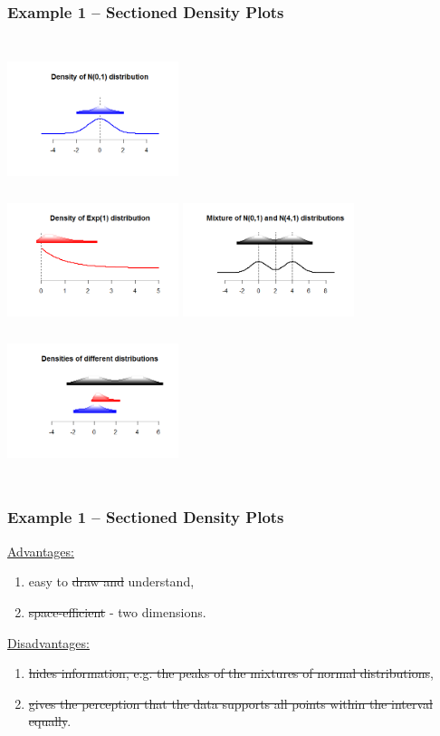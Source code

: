 \documentclass[11pt,usenames,dvipsnames,svgnames,x11names]{beamer}
\theoremstyle{plain}
\theoremstyle{definition}
\theoremstyle{remark}
\begin{document}
\begin{frame}
	\frametitle{Example 1 -- Sectioned Density Plots}
	\begin{columns}[t]
			\centering
			\includegraphics[width=5cm,height=4cm]{111111.png}\\
			\includegraphics[width=5cm,height=4cm]{222222.png}
		\centering
		\includegraphics[width=5cm,height=4cm]{333333.png}\\
		\includegraphics[width=5cm,height=4cm]{444444.png}
	\end{columns}
\end{frame}

\begin{frame}
	\frametitle{Example 1 -- Sectioned Density Plots}
	\underline{Advantages:}	
	\begin{enumerate}
		\item easy to \sout{draw and} understand,
		\item \sout{space-efficient} - two dimensions.
	\end{enumerate}
	\bigskip
	\underline{Disadvantages:}
	\begin{enumerate}
		\item \sout{hides information, e.g. the peaks of the mixtures of normal distributions},
		\item \sout{gives the perception that the data supports all points within the interval equally}.
	\end{enumerate}
\end{frame}
\end{document}
